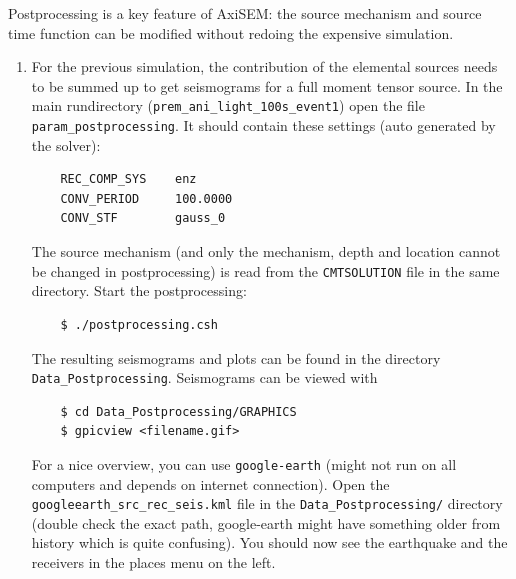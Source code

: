 \documentclass{article}
\begin{document}
Postprocessing is a key feature of AxiSEM: the source mechanism and source time function
can be modified without redoing the expensive simulation.

\begin{enumerate}
    \item For the previous simulation, the contribution of the elemental sources needs
    to be summed up to get seismograms for a full moment tensor source. In the
    main rundirectory (\verb|prem_ani_light_100s_event1|) open the file
    \verb|param_postprocessing|. It should contain these settings (auto generated by the
    solver):
    \begin{verbatim}
    REC_COMP_SYS    enz
    CONV_PERIOD     100.0000
    CONV_STF        gauss_0
    \end{verbatim}
    The source mechanism (and only the mechanism, depth and location cannot be changed
    in postprocessing) is read from the \verb|CMTSOLUTION| file in the same directory.
    Start the postprocessing:
    \begin{verbatim}
    $ ./postprocessing.csh
    \end{verbatim}
    The resulting seismograms and plots can be found in the directory 
    \verb|Data_Postprocessing|. Seismograms can be viewed with
    \begin{verbatim}
    $ cd Data_Postprocessing/GRAPHICS
    $ gpicview <filename.gif>
    \end{verbatim}
    For a nice overview, you can use \verb|google-earth| (might not run on all computers
    and depends on internet connection). Open the \verb|googleearth_src_rec_seis.kml| file
    in the \verb|Data_Postprocessing/| directory (double check the exact path,
    google-earth might have something older from history which is quite confusing).
    You should now see the earthquake and the receivers in the places menu on the left.
    

\end{enumerate}
\end{document}
